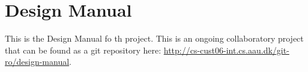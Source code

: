 
\chapter{Design Manual}
\label{app:design_manual}

This is the Design Manual fo th \giraf project. This is an ongoing collaboratory project that can be found as a git repository here: \url{http://cs-cust06-int.cs.aau.dk/git-ro/design-manual}.

